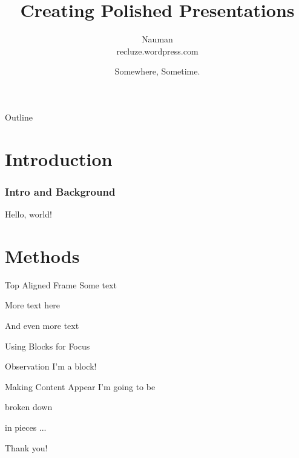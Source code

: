 \documentclass{beamer}
\title{Creating Polished Presentations}
\date{Somewhere, Sometime.}
\author{Nauman \\ recluze.wordpress.com}
\begin{document}
\maketitle

\begin{frame}{Outline}
\tableofcontents 
\end{frame}



\section{Introduction} 

\begin{frame}
\frametitle{Intro and Background}
Hello, world!
\end{frame}


\section{Methods} 
\begin{frame}[t]{Top Aligned Frame}
Some text 

More text here 

And even more text 
\end{frame}


\begin{frame}{Using Blocks for Focus}
\begin{block}{Observation}
	I'm a block! 
\end{block}
\end{frame}

\begin{frame}{Making Content Appear}
I'm going to be 

\pause 

broken down 

\pause 

in pieces ... 
\end{frame}


\begin{frame}[standout]
Thank you!
\end{frame}


\end{document}
